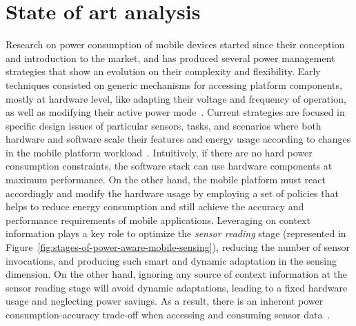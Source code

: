 \documentclass[12pt]{article}
\numberwithin{equation}{section}
\numberwithin{table}{section}
\numberwithin{figure}{section}
\begin{document}
\section{State of art analysis}
\label{sec:state-of-art}
Research on power consumption of mobile devices started since their conception and introduction to the market, and has produced several power management strategies that show an evolution on their complexity and flexibility.
Early techniques consisted on generic mechanisms for accessing platform components, mostly at hardware level, like adapting their voltage and frequency of operation, as well as modifying their active power mode~\cite{Mayo2003,Lorch1998,Benini2000}.
Current strategies are focused in specific design issues of particular sensors, tasks, and scenarios where both hardware and software scale their features and energy usage according to changes in the mobile platform workload~\cite{Lane2010,Hoseini-Tabatabaei2013}.
Intuitively, if there are no hard power consumption constraints, the software stack can use hardware components at maximum performance.
On the other hand, the mobile platform must react accordingly and modify the hardware usage by employing a set of policies that helps to reduce energy consumption and still achieve the accuracy and performance requirements of mobile applications.
Leveraging on context information plays a key role to optimize the \emph{sensor reading} stage (represented in Figure~\ref{fig:stages-of-power-aware-mobile-sensing}), reducing the number of sensor invocations, and producing such smart and dynamic adaptation in the sensing dimension.
On the other hand, ignoring any source of context information at the sensor reading stage will avoid dynamic adaptations, leading to a fixed hardware usage and neglecting power savings.
As a result, there is an inherent power consumption-accuracy trade-off when accessing and consuming sensor data~\cite{Sim2014,Rachuri2012}.
\end{document}

